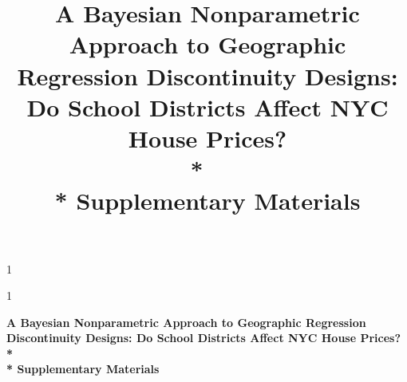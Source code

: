 \documentclass[letter,12pt]{article}
\newcommand{\blind}{1}
\newcommand{\georddtitle}{
    A Bayesian Nonparametric Approach to Geographic Regression Discontinuity Designs:
    Do School Districts Affect NYC House Prices? \\*
    ~\\*
    Supplementary Materials
}
\begin{document}
\doublespacing



\blind
{
\title{
    \Large
    \bf
    \georddtitle
}
\author{\georddauthor}
\maketitle
} \fi

\blind
{
  \bigskip
  \bigskip
  \bigskip
  \begin{center}
    {\LARGE\bf \georddtitle}
\end{center}
  \medskip
} \fi





\end{document}
